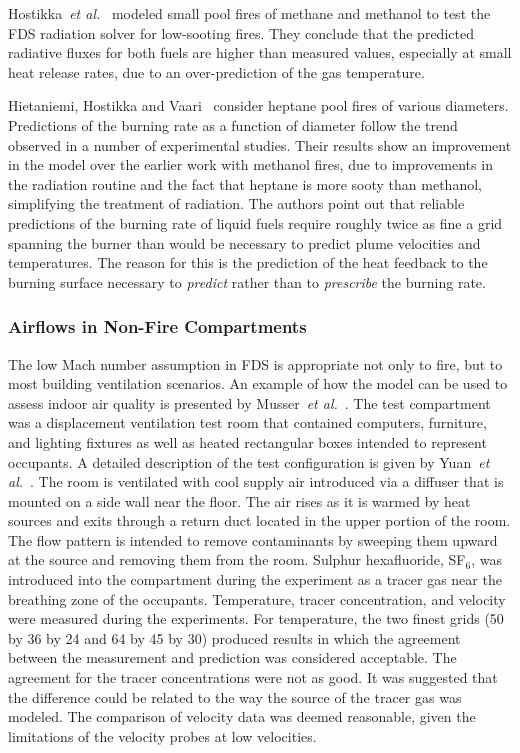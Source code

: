 Hostikka~{\em  et al.}~\cite{Hostikka:3} modeled  small pool  fires of methane and methanol to test  the FDS radiation solver for low-sooting fires.
They conclude that  the predicted  radiative fluxes  for both fuels  are  higher than  measured  values,  especially  at small  heat release rates,
due to an over-prediction of the gas temperature.

Hietaniemi,  Hostikka and  Vaari~\cite{Hietaniemi:1}  consider heptane pool fires of various diameters.  Predictions of the burning rate as a
function  of  diameter  follow  the  trend observed  in  a  number  of experimental studies.  Their results show an improvement  in the model over
the earlier work with  methanol fires, due to improvements in the radiation  routine  and the  fact  that  heptane  is more  sooty  than methanol,
simplifying  the treatment of radiation.   The authors point out  that reliable  predictions of  the burning  rate of  liquid fuels require roughly
twice as fine a grid spanning the burner than would be necessary to predict plume velocities and temperatures. The reason for this is  the prediction
of the heat  feedback to the  burning surface necessary to {\em predict} rather  than to {\em prescribe} the burning rate.


\subsubsection{Airflows in Non-Fire Compartments}

The low Mach number assumption in FDS is appropriate not only to fire, but to  most building  ventilation scenarios.  An  example of  how the model
can  be used  to  assess indoor  air  quality  is presented  by Musser~{\em  et  al.}~\cite{Musser:1}.   The  test compartment  was  a displacement
ventilation  test   room   that  contained   computers, furniture, and  lighting fixtures as well as  heated rectangular boxes intended to  represent
occupants.  A detailed description  of the test configuration is  given by Yuan~{\em et  al.}~\cite{Yuan:1}.  The room is ventilated with  cool
supply air introduced via  a diffuser that is mounted on a side  wall near the floor. The air rises  as it is warmed by heat sources  and exits
through a return duct  located in the upper portion  of  the  room.  The   flow  pattern  is  intended  to  remove contaminants by sweeping  them
upward at the source  and removing them from the room.  Sulphur  hexafluoride, SF$_6$, was introduced into the compartment during the  experiment as
a tracer gas  near the breathing zone  of  the   occupants.   Temperature,  tracer  concentration,  and velocity were  measured during the
experiments.   For temperature, the two finest grids (50 by 36 by  24 and 64 by 45 by 30) produced results in  which the  agreement between  the
measurement  and  prediction was considered  acceptable.  The agreement  for the  tracer concentrations were  not as  good.  It  was suggested  that
the  difference  could be related to  the way  the source  of the tracer  gas was  modeled.  The comparison  of   velocity  data  was  deemed
reasonable,  given  the limitations of the velocity probes at low velocities.

